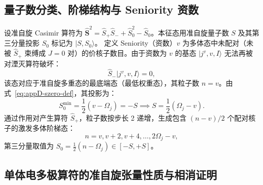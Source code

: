 \subsection{量子数分类、阶梯结构与 Seniority 资数}

设准自旋 Casimir 算符为 $\hat{\mathbf{S}}^2 = \hat{S}_+ \hat{S}_- + \hat{S}_0^2 - \hat{S}_0$。本征态用准自旋量子数 $S$ 及其第三分量投影 $S_0$ 标记为 $|S, S_0\rangle$。
定义 Seniority（资数）$v$ 为多体态中未配对（未被 $\hat{S}_+$ 束缚成 $J=0$ 对）的价核子数目。由于资数为 $v$ 的基态 $|j^v, v, I\rangle$ 无法再被对湮灭算符破坏：
\begin{equation}\label{eq:appD-seniority-ground-cond}
\hat{S}_- |j^v, v, I\rangle = 0,
\end{equation}
该态对应于准自旋多重态的最底端态（最低权重态），其粒子数 $n = v$。由式~\eqref{eq:appD-szero-def}，其投影为：
\begin{equation}\label{eq:appD-s0-lowest}
S_0^{\min} = \frac{1}{2}(v - \Omega_j) = -S \implies S = \frac{1}{2}(\Omega_j - v).
\end{equation}
通过作用对产生算符 $\hat{S}_+$，粒子数按步长 2 递增，生成包含 $(n-v)/2$ 个配对核子的激发多体阶梯态：
\begin{equation}\label{eq:appD-quasispin-ladder}
n = v, v + 2, v + 4, \dots, 2\Omega_j - v,
\end{equation}
第三分量取值为 $S_0 = \frac{1}{2}(n - \Omega_j) \in [-S, +S]$。

\subsection{单体电多极算符的准自旋张量性质与相消证明}

